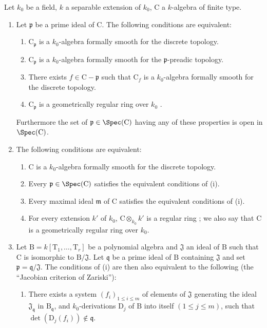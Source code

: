 \begin{proposition}[22.6.7]
\label{0.22.6.7}
Let $k_0$ be a field, $k$ a separable extension of $k_0$, $\mathrm{C}$ a $k$-algebra of finite type.
\begin{enumerate}
  \item[\rm{(i)}] Let $\mathfrak{p}$ be a prime ideal of $\mathrm{C}$.
  The following conditions are equivalent:
  \begin{enumerate}
    \item[a)] $\mathrm{C}_\mathfrak{p}$ is a $k_0$-algebra formally smooth for the discrete topology.
    \item[b)] $\mathrm{C}_\mathfrak{p}$ is a $k_0$-algebra formally smooth for the $\mathfrak{p}$-preadic topology.
    \item[c)] There exists $f\in\mathrm{C}-\mathfrak{p}$ such that $\mathrm{C}_f$ is a $k_0$-algebra formally smooth for the discrete topology.
    \item[d)] $\mathrm{C}_\mathfrak{p}$ is a geometrically regular ring over $k_0$ .
  \end{enumerate}
  Furthermore the set of $\mathfrak{p}\in\Spec(\mathrm{C})$ having any of these properties is open in $\Spec(\mathrm{C})$.
  \item[\rm{(ii)}] The following conditions are equivalent:
  \begin{enumerate}
    \item[a)] $\mathrm{C}$ is a $k_0$-algebra formally smooth for the discrete topology.
    \item[b)] Every $\mathfrak{p}\in\Spec(\mathrm{C})$ satisfies the equivalent conditions of (i).
    \item[c)] Every maximal ideal $\mathfrak{m}$ of $\mathrm{C}$ satisfies the equivalent conditions of (i).
    \item[d)] For every extension $k'$ of $k_0$, $\mathrm{C}\otimes_{k_0}k'$ is a regular ring ; we also say that $\mathrm{C}$ is a geometrically regular ring over $k_0$.
  \end{enumerate}


  \item[\rm{(iii)}] Let
  $\mathrm{B}=k[\mathrm{T}_1,\ldots,\mathrm{T}_r]$ be a polynomial algebra and
  $\mathfrak{J}$ an ideal of $\mathrm{B}$ such that $\mathrm{C}$ is
  isomorphic to $\mathrm{B}/\mathfrak{J}$. Let $\mathfrak{q}$ be a prime
  ideal of $\mathrm{B}$ containing $\mathfrak{J}$ and set
  $\mathfrak{p}=\mathfrak{q}/\mathfrak{J}$. The conditions of (i) are then
  also equivalent to the following (the ``Jacobian criterion of Zariski''):
  \begin{enumerate}
    \item[e)] There exists a system $(f_i)_{1\leq i\leq m}$ of elements of
    $\mathfrak{J}$ generating the ideal $\mathfrak{J}_\mathfrak{q}$ in
    $\mathrm{B}_\mathfrak{q}$, and $k_0$-derivations $\mathrm{D}_j$ of
    $\mathrm{B}$ into itself $(1\leq j\leq m)$, such that
    $\det(\mathrm{D}_j(f_i))\notin\mathfrak{q}$.
  \end{enumerate}
\end{enumerate}
\end{proposition}

